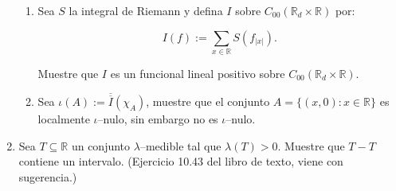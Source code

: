 \documentclass[letter,twoside,12pt]{article}
\numberwithin{equation}{section}
\begin{document}
\begin{enumerate}[label = (\textbf{\arabic*.})]
\begin{enumerate}[label = (\textbf{\roman*.})]
\item Sea $ S $ la integral de Riemann y defina $ I $ sobre $ C_{00}(\mathbb{R}_d \times \mathbb{R}) $ por:

$$ I(f) := \sum_{x \in \mathbb{R}}S(f_{|x|}). $$

Muestre que $ I $ es un funcional lineal positivo sobre $ C_{00}(\mathbb{R}_d \times \mathbb{R}) $.

\item Sea $ \iota(A)  := \overline{\overline{I}}(\chi_A) $, muestre que el conjunto $ A = \{(x,0) : x \in \mathbb{R}\} $ es localmente $ \iota $–nulo, sin embargo no es $ \iota $–nulo.
\end{enumerate}

\item Sea $ T \subseteq \mathbb{R} $ un conjunto $ \lambda $–medible tal que $ \lambda(T) > 0 $. Muestre que $ T-T $ contiene un intervalo. (Ejercicio 10.43 del libro de texto, viene con sugerencia.)
\end{enumerate}



\end{document}
